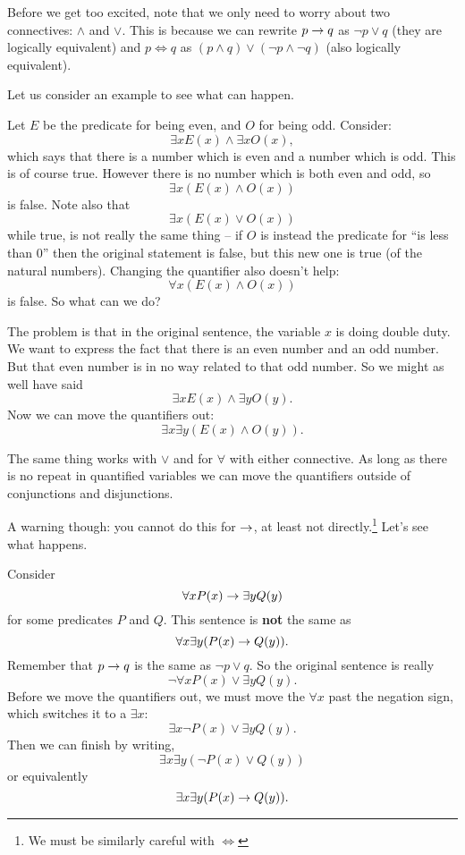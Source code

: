 \documentclass[12pt]{article}
\begin{document}
Before we get too excited, note that we only need to worry about two connectives: $\wedge$ and $\vee$.  This is because we can rewrite $p \rightarrow q$ as $\neg p \vee q$ (they are logically equivalent) and $p \iff q$ as $(p \wedge q) \vee (\neg p \wedge \neg q)$ (also logically equivalent).  

Let us consider an example to see what can happen.

\begin{example} 
  Let $E$ be the predicate for being even, and $O$ for being odd.  Consider:
\[\exists x E(x) \wedge \exists x O(x),\]
which says that there is a number which is even and a number which is odd.  This is of course true.  However there is no number which is both even and odd, so 
\[\exists x (E(x) \wedge O(x))\]
is false.  Note also that
\[\exists x (E(x) \vee O(x))\]
while true, is not really the same thing -- if $O$ is instead the predicate for ``is less than 0'' then the original statement is false, but this new one is true (of the natural numbers).  Changing the quantifier also doesn't help:
\[\forall x (E(x) \wedge O(x))\]
is false.  So what can we do?

The problem is that in the original sentence, the variable $x$ is doing double duty.  We want to express the fact that there is an even number and an odd number.  But that even number is in no way related to that odd number.  So we might as well have said
\[ \exists x E(x) \wedge \exists y O(y).\]
Now we can move the quantifiers out:
\[\exists x \exists y (E(x) \wedge O(y)).\]
\end{example}

The same thing works with $\vee$ and for $\forall$ with either connective.  As long as there is no repeat in quantified variables we can move the quantifiers outside of conjunctions and disjunctions.  

A warning though: you cannot do this for $\rightarrow$, at least not directly.\footnote{We must be similarly careful with $\iff$}  Let's see what happens.  

\begin{example}
Consider
\[ \forall x P(x) \rightarrow \exists y Q(y)\]
for some predicates $P$ and $Q$.  This sentence is {\bf not} the same as
\[ \forall x \exists y (P(x) \rightarrow Q(y)).\]
Remember that $p \rightarrow q$ is the same as $\neg p \vee q$.  So the original sentence is really
\[\neg \forall x P(x) \vee \exists y Q(y).\]
Before we move the quantifiers out, we must move the $\forall x$ past the negation sign, which switches it to a $\exists x$:
\[\exists x \neg P(x) \vee \exists y Q(y).\]
Then we can finish by writing,
\[\exists x \exists y (\neg P(x) \vee Q(y))\]
or equivalently
\[\exists x \exists y (P(x) \rightarrow Q(y)).\]
\end{example}
\end{document}
